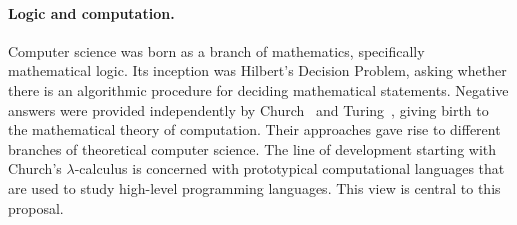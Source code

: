 \documentclass[11pt,twocolumn]{article}
\newcommand{\hide}[1]{}
\newcommand{\pref}[1]{\,(\ref{#1})}
\newcommand{\lcalculus}{\mbox{$\lambda$-calculus}}
\begin{document}
\paragraph*{Logic and computation.}

Computer science was born as a branch of mathematics, specifically
mathematical logic. %
Its inception %
was Hilbert's %
Decision Problem, %
asking whether there is an algorithmic procedure for deciding mathematical
statements.  Negative answers were provided independently by
Church~\cite{Church1936} 
and 
Turing~\cite{Turing},
giving birth to the mathematical theory of computation.  Their 
approaches gave rise to different branches of theoretical
computer science. %
The line of development starting with Church's {\lcalculus} %
is concerned with prototypical computational languages that are
used to study high-level programming languages.  
%
This %
view is central to this proposal.  
\hide{
The {\lcalculus} is a
deceptively simple formal system.  Its syntax consists of three types of
phrases: variables, applications, and abstraction.  Church's seminal
innovation was in introducing the latter one, 
which in modern terminology is referred to as a binding operator, a notion
that goes beyond the operators of universal algebra. %
Binding operators are an integral part of all high-level programming
languages.  
}

\end{document}
